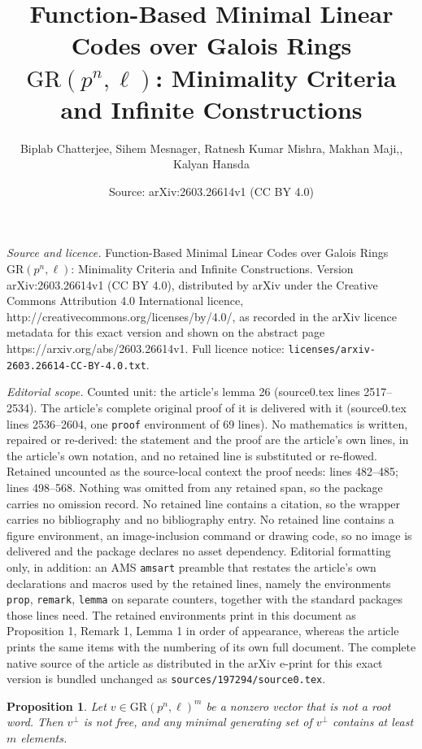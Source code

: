 \documentclass[10pt,a4paper]{amsart}
\title{Function-Based Minimal Linear Codes over Galois Rings $\mathrm{GR}(p^{n}, \ell)$: Minimality Criteria and Infinite Constructions}
\author{Biplab Chatterjee, Sihem Mesnager, Ratnesh Kumar Mishra, Makhan Maji,, Kalyan Hansda}
\date{Source: arXiv:2603.26614v1 (CC BY 4.0)}
\newtheorem{prop}{Proposition}
\begin{document}
\maketitle

\noindent\emph{Source and licence.} Function-Based Minimal Linear Codes over Galois Rings $\mathrm{GR}(p^{n}, \ell)$: Minimality Criteria and Infinite Constructions. Version arXiv:2603.26614v1 (CC BY 4.0), distributed by arXiv under the Creative Commons Attribution 4.0 International licence, http://creativecommons.org/licenses/by/4.0/, as recorded in the arXiv licence metadata for this exact version and shown on the abstract page https://arxiv.org/abs/2603.26614v1. Full licence notice: \texttt{licenses/arxiv-2603.26614-CC-BY-4.0.txt}.\par\smallskip

\noindent\textit{Editorial scope.} Counted unit: the article's lemma 26 (source0.tex lines 2517--2534). The article's complete original proof of it is delivered with it (source0.tex lines 2536--2604, one \texttt{proof} environment of 69 lines). No mathematics is written, repaired or re-derived: the statement and the proof are the article's own lines, in the article's own notation, and no retained line is substituted or re-flowed.  Retained uncounted as the source-local context the proof needs: lines 482--485; lines 498--568.  Nothing was omitted from any retained span, so the package carries no omission record.  No retained line contains a citation, so the wrapper carries no bibliography and no bibliography entry.  No retained line contains a figure environment, an image-inclusion command or drawing code, so no image is delivered and the package declares no asset dependency.  Editorial formatting only, in addition: an AMS \texttt{amsart} preamble that restates the article's own declarations and macros used by the retained lines, namely the environments \texttt{prop}, \texttt{remark}, \texttt{lemma} on separate counters, together with the standard packages those lines need.  The retained environments print in this document as Proposition 1, Remark 1, Lemma 1 in order of appearance, whereas the article prints the same items with the numbering of its own full document.  The complete native source of the article as distributed in the arXiv e-print for this exact version is bundled unchanged as \texttt{sources/197294/source0.tex}.
\begin{prop}\label{Proposition 11}
Let $v \in \mathrm{GR}(p^{n},\ell)^{m}$ be a nonzero vector that is not a root word.
Then $v^{\perp}$ is not free, and any minimal generating set of $v^{\perp}$ contains at least $m$ elements.
\end{prop}
\end{document}
